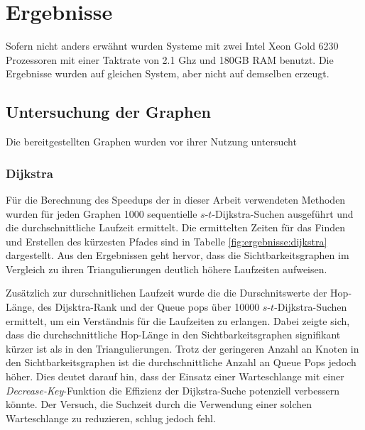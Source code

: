 \chapter{Ergebnisse}

Sofern nicht anders erwähnt wurden Systeme mit zwei Intel Xeon Gold 6230 Prozessoren mit einer Taktrate von 2.1 Ghz und 180GB RAM benutzt.
Die Ergebnisse wurden auf gleichen System, aber nicht auf demselben erzeugt.

\section{Untersuchung der Graphen}

Die bereitgestellten Graphen wurden vor ihrer Nutzung untersucht
\subsection{Dijkstra}

Für die Berechnung des Speedups der in dieser Arbeit verwendeten Methoden wurden für jeden Graphen \num{1000} sequentielle $s$-$t$-Dijkstra-Suchen ausgeführt und die durchschnittliche Laufzeit ermittelt.
Die ermittelten Zeiten für das Finden und Erstellen des kürzesten Pfades sind in Tabelle \ref{fig:ergebnisse:dijkstra} dargestellt.
Aus den Ergebnissen geht hervor, dass die Sichtbarkeitsgraphen im Vergleich zu ihren Triangulierungen deutlich höhere Laufzeiten aufweisen.

Zusätzlich zur durschnitlichen Laufzeit wurde die die Durschnitswerte der Hop-Länge, des Dijsktra-Rank und der Queue pops über \num{10000} $s$-$t$-Dijkstra-Suchen ermittelt, um ein Verständnis für die Laufzeiten zu erlangen.
Dabei zeigte sich, dass die durchschnittliche Hop-Länge in den Sichtbarkeitsgraphen signifikant kürzer ist als in den Triangulierungen.
Trotz der geringeren Anzahl an Knoten in den Sichtbarkeitsgraphen ist die durchschnittliche Anzahl an Queue Pops jedoch höher.
Dies deutet darauf hin, dass der Einsatz einer Warteschlange mit einer \emph{Decrease-Key}-Funktion die Effizienz der Dijkstra-Suche potenziell verbessern könnte.
Der Versuch, die Suchzeit durch die Verwendung einer solchen Warteschlange zu reduzieren, schlug jedoch fehl.

